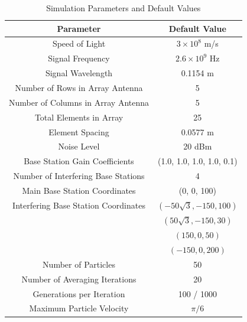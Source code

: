 \documentclass[lettersize,journal]{IEEEtran}
\begin{document}
\begin{table}[!t]
  \caption{Simulation Parameters and Default Values\label{tab:table1}}
  \centering
  \begin{tabular}{|c||c|}
    \hline
    \textbf{Parameter}                   & \textbf{Default Value}       \\
    \hline
    Speed of Light                       & $3 \times 10^8$ m/s          \\
    \hline
    Signal Frequency                     & $2.6 \times 10^9$ Hz         \\
    \hline
    Signal Wavelength                    & 0.1154 m                     \\
    \hline
    Number of Rows in Array Antenna      & 5                            \\
    \hline
    Number of Columns in Array Antenna   & 5                            \\
    \hline
    Total Elements in Array              & 25                           \\
    \hline
    Element Spacing                      & 0.0577 m                     \\
    \hline
    Noise Level                          & 20 dBm                       \\
    \hline
    Base Station Gain Coefficients       & (1.0, 1.0, 1.0, 1.0, 0.1)    \\
    \hline
    Number of Interfering Base Stations  & 4                            \\
    \hline
    Main Base Station Coordinates        & (0, 0, 100)                  \\
    \hline
    Interfering Base Station Coordinates & \((-50\sqrt{3}, -150, 100)\) \\
                                         & \((50\sqrt{3}, -150, 30)\)   \\
                                         & \((150, 0, 50)\)             \\
                                         & \((-150, 0, 200)\)           \\
    \hline
    Number of Particles                  & 50                           \\
    \hline
    Number of Averaging Iterations       & 20                           \\
    \hline
    Generations per Iteration            & 100 / 1000                   \\
    \hline
    Maximum Particle Velocity            & $\pi / 6$                    \\

\end{tabular}
\end{table}
\end{document}
